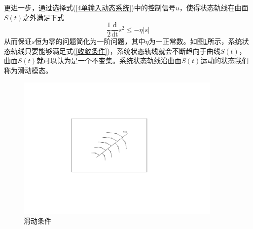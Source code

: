 更进一步，通过选择式(\ref{4单输入动态系统})中的控制信号$u$，使得状态轨线在曲面$S(t)$之外满足下式
\begin{equation}
\label{收敛条件}
\frac{1}{2}\frac{\text{d}}{\text{dt}}s^2\leq-\eta\left|s\right|
\end{equation}
从而保证$s$恒为零的问题简化为一阶问题，其中$\eta$为一正常数。如图\ref*{滑动条件}所示，系统状态轨线只要能够满足式(\ref{收敛条件})，系统状态轨线就会不断趋向于曲线$S(t)$，曲面$S(t)$就可以认为是一个不变集。系统状态轨线沿曲面$S(t)$运动的状态我们称为滑动模态。
\begin{figure}[H]
	\centering
	\includegraphics[width=10cm]{figures/滑动条件.pdf}
	\caption{滑动条件}
	\label{滑动条件}
\end{figure}

